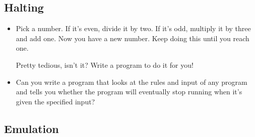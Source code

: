 \documentclass{article}
\newcommand*{\writeit}{\item[\NibRight]}
\newcommand*\proveit{\item[\manimpossiblecube]}
\begin{document}
\subsection*{Halting}
\begin{itemize}
\writeit Pick a number. If it's even, divide it by two. If it's odd, multiply it by three and add one. Now you have a new number. Keep doing this until you reach one.

Pretty tedious, isn't it? Write a program to do it for you!
\proveit Can you write a program that looks at the rules and input of any program and tells you whether the program will eventually stop running when it's given the specified input?
\end{itemize}
\subsection*{Emulation}
\end{document}
